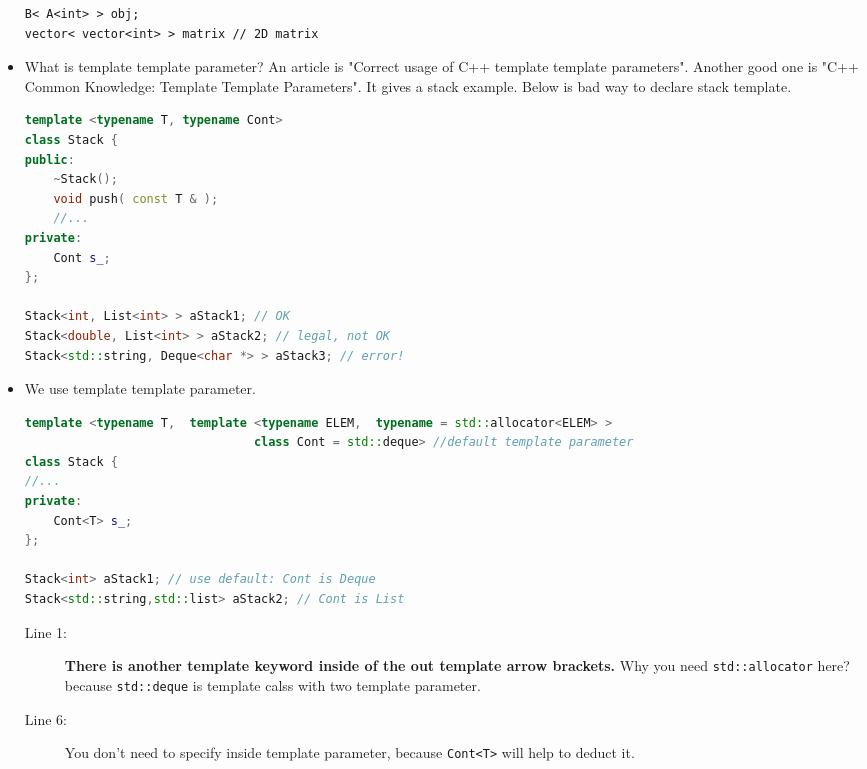 \documentclass[a4paper,11pt,twoside]{book}
\begin{document}
\begin{itemize}
\begin{lstlisting}[]
B< A<int> > obj;
vector< vector<int> > matrix // 2D matrix
\end{lstlisting}

    \item What is template template parameter? An article is "Correct usage of C++ template template parameters". Another good one is "C++ Common Knowledge: Template Template Parameters". It gives a stack example. Below is bad way to declare stack template.
\begin{lstlisting}[frame=single, language=c++]
template <typename T, typename Cont>
class Stack {
public:
	~Stack();
	void push( const T & );
	//...
private:
	Cont s_;
};

Stack<int, List<int> > aStack1; // OK
Stack<double, List<int> > aStack2; // legal, not OK           
Stack<std::string, Deque<char *> > aStack3; // error!   
\end{lstlisting}
    \item We use template template parameter. 

\begin{lstlisting}[frame=single, language=c++]
template <typename T,  template <typename ELEM,  typename = std::allocator<ELEM> > 
								class Cont = std::deque> //default template parameter
class Stack {
//...
private:
	Cont<T> s_;
};

Stack<int> aStack1; // use default: Cont is Deque
Stack<std::string,std::list> aStack2; // Cont is List
\end{lstlisting}
\begin{description}
	\item[Line 1:] \textbf{There is another template keyword inside of the out template arrow brackets.}  Why you need \texttt{std::allocator} here? because \texttt{std::deque} is template calss with two template parameter.
	
	\item[Line 6:] You don't need to specify inside template parameter, because \texttt{Cont<T>} will help to deduct it.
	
\end{description}

\end{itemize}


	
\end{document}
